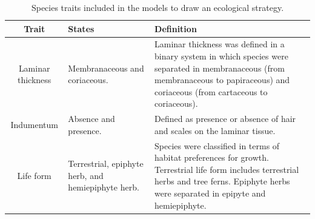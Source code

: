 \documentclass[12pt]{article}
\begin{document}

\begin{table}[!hb]
    \caption{ Species traits included in the models to draw an ecological strategy.}\label{trait}
  \begin{tabular}{cp{4cm}p{6cm}}
 \toprule	
\bf{Trait}	&	\bf{States}	&	\bf{Definition} 	\\
\hline
Laminar thickness	&	Membranaceous and coriaceous.	&	Laminar thickness was defined in a binary system in which species were separated in membranaceous (from membranaceous to papiraceous) and coriaceous (from cartaceous to coriaceous).	 \\
Indumentum	&	Absence and presence.	&	Defined as presence or absence of hair and scales on the laminar tissue.  \\
Life form	&	Terrestrial, epiphyte herb, and hemiepiphyte herb.	&	Species were classified in terms of habitat preferences for growth. Terrestrial life form includes terrestrial herbs and tree ferns. Epiphyte herbs were separated in epipyte and hemiepiphyte. \\
\bottomrule
\end{tabular}
\end{table}


\newpage
\end{document}
